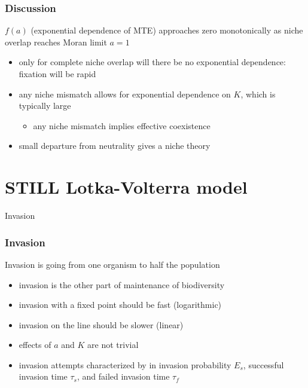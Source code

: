 \documentclass{beamer}
\begin{document}
\begin{frame}
\frametitle{Discussion}
$f(a)$ (exponential dependence of MTE) approaches zero monotonically as  niche overlap reaches Moran limit $a=1$ 
\begin{itemize}
	\item only for complete niche overlap will there be no exponential dependence: fixation will be rapid
	\pause
	\item any niche mismatch allows for exponential dependence on $K$, which is typically large
	\begin{itemize}
		\item any niche mismatch implies effective coexistence
	\end{itemize}
	\pause
	\item small departure from neutrality gives a niche theory
\end{itemize}
\end{frame}



\section[Invasion]{STILL Lotka-Volterra model}

\begin{frame}
\centering
{{\Huge Invasion}}
\end{frame}


\begin{frame}
\frametitle{Invasion}
Invasion is going from one organism to half the population
\begin{itemize}
	\pause
	\item invasion is the other part of maintenance of biodiversity
	\pause
	\item invasion with a fixed point should be fast (logarithmic)
	\pause
	\item invasion on the line should be slower (linear)
	\pause
	\item effects of $a$ and $K$ are not trivial
	\pause
	\item invasion attempts characterized by in invasion probability $E_s$, successful invasion time $\tau_s$, and failed invasion time $\tau_f$
\end{itemize}
\end{frame}
\end{document}
